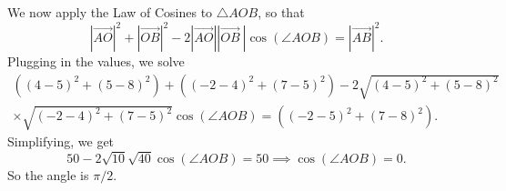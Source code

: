 
We now apply the Law of Cosines to $\triangle AOB$, so that\[
	|\overrightarrow{AO}|^2  +|\overrightarrow{OB}|^2- 2 |\overrightarrow{AO}| |\overrightarrow{OB} \ |\cos(\angle AOB) = |\overrightarrow{AB}|^2.
\]
Plugging in the values, we solve 
\begin{align*}
		((4-5)^2 + (5-8)^2) + ((-2-4)^2+(7-5)^2) - 2 \sqrt{(4-5)^2 + (5-8)^2} \\ \times \sqrt{(-2-4)^2+(7-5)^2} \cos(\angle AOB) = ((-2-5)^2+(7-8)^2).
\end{align*}
Simplifying, we get\[
	50 - 2 \sqrt{10} \sqrt{40} \cos(\angle AOB) = 50 \implies \cos(\angle AOB) = 0.
\]
So the angle is $\pi/2$.

